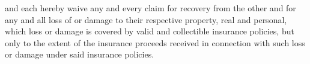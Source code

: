 \lessor and \lessee each hereby waive any and every claim for recovery from the other and for any and all loss of or damage to their respective property, real and personal, which loss or damage is covered by valid and collectible insurance policies, but only to the extent of the insurance proceeds received in connection with such loss or damage under said insurance policies.
